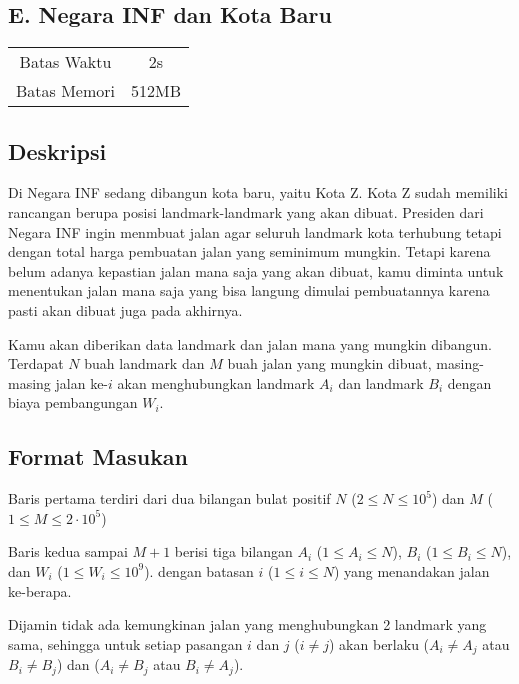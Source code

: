 \documentclass{article}
\begin{document}
\begin{center}
    \section*{E. Negara INF dan Kota Baru} %

    \begin{tabular}{ | c c | }
        \hline
        Batas Waktu  & 2s \\    %
        Batas Memori & 512MB \\  %
        \hline
    \end{tabular}
\end{center}

\subsection*{Deskripsi}

Di Negara INF sedang dibangun kota baru, yaitu Kota Z. Kota Z sudah memiliki rancangan berupa posisi landmark-landmark yang akan dibuat.
Presiden dari Negara INF ingin menmbuat jalan agar seluruh landmark kota terhubung tetapi dengan total harga pembuatan jalan yang seminimum mungkin. Tetapi karena belum adanya kepastian jalan mana saja yang akan dibuat, kamu diminta untuk menentukan jalan mana saja yang bisa langung dimulai pembuatannya karena pasti akan dibuat juga pada akhirnya.

Kamu akan diberikan data landmark dan jalan mana yang mungkin dibangun.
Terdapat $N$ buah landmark dan $M$ buah jalan yang mungkin dibuat, masing-masing jalan ke-$i$ akan menghubungkan landmark $A_i$ dan landmark $B_i$ dengan biaya pembangungan $W_i$.

\subsection*{Format Masukan}

Baris pertama terdiri dari dua bilangan bulat positif $N$ ($2 \leq N \leq 10^5$) dan $M$ ($1 \leq M \leq 2 \cdot 10^5$)

Baris kedua sampai $M + 1$ berisi tiga bilangan $A_i$ ($1 \leq A_i \leq N$), $B_i$ ($1 \leq B_i \leq N$), dan $W_i$ ($1 \leq W_i \leq 10^9$). dengan batasan $i$ ($1 \leq i \leq N$) yang menandakan jalan ke-berapa.

Dijamin tidak ada kemungkinan jalan yang menghubungkan 2 landmark yang sama, sehingga untuk setiap pasangan $i$ dan $j$ ($i \neq j$) akan berlaku ($A_i \neq A_j$ atau $B_i \neq B_j$) dan ($A_i \neq B_j$ atau $B_i \neq A_j$).
\end{document}
